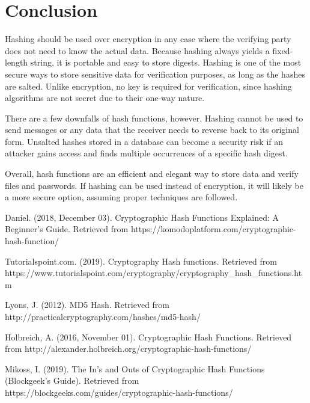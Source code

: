 \documentclass{article}
\begin{document}
\section{Conclusion}
\tab Hashing should be used over encryption in any case where the verifying party does not need to know the actual data. Because hashing always yields a fixed-length string, it is portable and easy to store digests. Hashing is one of the most secure ways to store sensitive data for verification purposes, as long as the hashes are salted. Unlike encryption, no key is required for verification, since hashing algorithms are not secret due to their one-way nature.

There are a few downfalls of hash functions, however. Hashing cannot be used to send messages or any data that the receiver needs to reverse back to its original form. Unsalted hashes stored in a database can become a security risk if an attacker gains access and finds multiple occurrences of a specific hash digest.

Overall, hash functions are an efficient and elegant way to store data and verify files and passwords. If hashing can be used instead of encryption, it will likely be a more secure option, assuming proper techniques are followed.

\newpage
\begin{thebibliography}{}
	Daniel. (2018, December 03). Cryptographic Hash Functions Explained: A Beginner's Guide. Retrieved from {https://komodoplatform.com/cryptographic-hash-function/}
	
	Tutorialspoint.com. (2019). Cryptography Hash functions. Retrieved from {https://www.tutorialspoint.com/cryptography/cryptography\_hash\_functions.htm}
	
	Lyons, J. (2012). MD5 Hash. Retrieved from {http://practicalcryptography.com/hashes/md5-hash/}
	
	Holbreich, A. (2016, November 01). Cryptographic Hash Functions. Retrieved from {http://alexander.holbreich.org/cryptographic-hash-functions/}	
	
	Mikoss, I. (2019). The In's and Outs of Cryptographic Hash Functions (Blockgeek's Guide).
	Retrieved from {https://blockgeeks.com/guides/cryptographic-hash-functions/}
\end{thebibliography}
\end{document}
